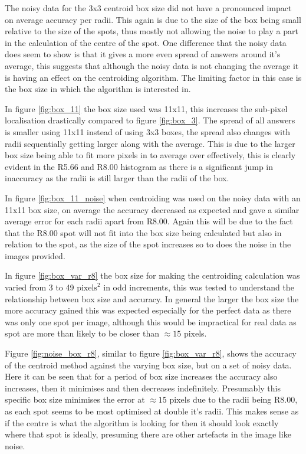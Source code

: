   The noisy data for the 3x3 centroid box size did not have a pronounced impact on average 
  accuracy per radii. This again is due to the size of the box being small relative to the 
  size of the spots, thus mostly not allowing the noise to play a part in the calculation of the 
  centre of the spot. One difference that the noisy data does seem to show is that it gives a more 
  even spread of answers around it's average, this suggests that although the noisy data 
  is not changing the average it is having an effect on the centroiding algorithm. The limiting factor 
  in this case is the box size in which the algorithm is interested in.

  In figure \ref{fig:box_11} the box size used was 11x11, this increases the sub-pixel localisation 
  drastically compared to figure \ref{fig:box_3}. The spread of all answers is smaller using 11x11 instead of using 3x3
  boxes, the spread also changes with radii sequentially getting larger along with the average. 
  This is due to the larger box size being able to fit 
  more pixels in to average over effectively, this is clearly evident in the R5.66 and R8.00 histogram as there is a 
  significant jump in inaccuracy as the radii is still larger than the radii of the box. 

  In figure \ref{fig:box_11_noise} when centroiding was used on the noisy data with an 11x11 box size, 
  on average the accuracy decreased as expected and gave a similar average error for each radii apart from R8.00. 
  Again this will be due to the fact that the R8.00 spot will not fit into the box size being calculated 
  but also in relation to the spot, as the size of the spot increases so to does the noise in the images 
  provided.

  In figure \ref{fig:box_var_r8} the box size for making the centroiding calculation 
  was varied from 3 to 49 $\textrm{pixels}^2$ in odd increments, this was tested to understand the 
  relationship between box size and accuracy. In general the larger the box size the more accuracy 
  gained this was expected especially for the perfect data as there was only one spot per image, 
  although this would be impractical for real data as spot are more than likely to be closer than 
  $\approx 15$ pixels. 

  Figure \ref{fig:noise_box_r8}, similar to figure \ref{fig:box_var_r8}, shows the accuracy of the 
  centroid method against the varying box size, but on a set of noisy data. Here it can be seen that 
  for a period of box size increases the accuracy also increases, then it minimises and then decreases indefinitely.
  Presumably this specific box size minimises the error at $\approx 15$ pixels due to the radii being R8.00, 
  as each spot seems to be most optimised at double it's radii. This makes sense as if the centre is 
  what the algorithm is looking for then it should look exactly where that spot is ideally, presuming 
  there are other artefacts in the image like noise. 
